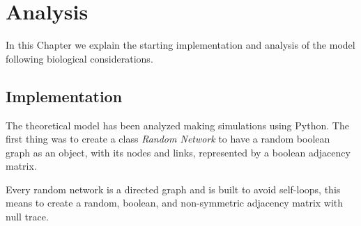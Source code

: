 \chapter{Analysis}\label{analysis}
\lhead[\fancyplain{}{\bfseries\thepage}]{\fancyplain{}{\bfseries\rightmark}}

In this Chapter we explain the starting implementation and analysis of the model following biological considerations.

\section{Implementation}

The theoretical model has been analyzed making simulations using Python.
The first thing was to create a class \emph{Random Network} to have a random boolean graph as an object, with its nodes and links, represented by a boolean adjacency matrix.

Every random network is a directed graph and is built to avoid self-loops, this means to create a random, boolean, and non-symmetric adjacency matrix with null trace.

